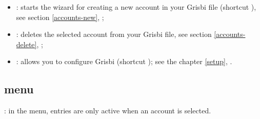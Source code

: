 \begin{itemize}
\begin{itemize}
\begin{itemize}
			 	\end{itemize}
			\item opens the  window for a report when the \enquote{Reports} tab of the navigation panel or a report is selected, see chapter \vref{reports-creation}, ;
		\end{itemize}
	\item {}: starts the wizard for creating a new account in your Grisbi file (shortcut ), see section \vref{accounts-new}, ;
	\item {}: deletes the selected account from your Grisbi file, see section \vref{accounts-delete}, ;
	\item {}: allows you to configure Grisbi (shortcut ); see the chapter \vref{setup}, .
\end{itemize}


\subsection{ menu\label{home-menus-display}}

\Note{}: in the  menu, entries are only active when an account is selected.


